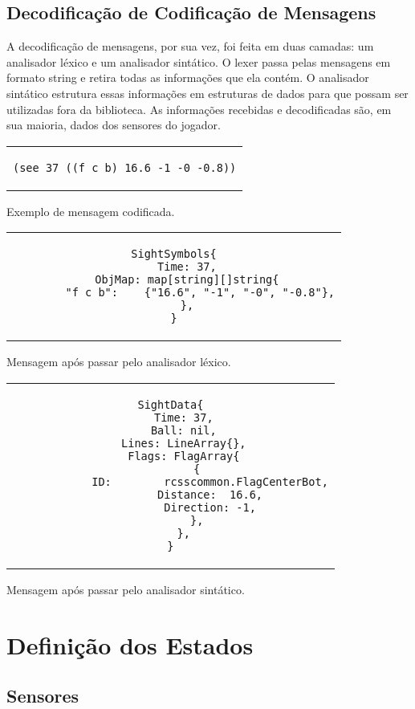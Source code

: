 \subsection{Decodificação de Codificação de Mensagens}
A decodificação de mensagens, por sua vez, foi feita em duas camadas: um analisador léxico e um analisador sintático. O lexer passa pelas mensagens em formato string e retira todas as informações que ela contém. O analisador sintático estrutura essas informações em estruturas de dados para que possam ser utilizadas fora da biblioteca. As informações recebidas e decodificadas são, em sua maioria, dados dos sensores do jogador.
\begin{center}



\begin{tabular}{c}
\begin{lstlisting}
(see 37 ((f c b) 16.6 -1 -0 -0.8))
\end{lstlisting}
\end{tabular}

Exemplo de mensagem codificada.


\begin{tabular}{c}
\begin{lstlisting}
SightSymbols{
	Time: 37,
	ObjMap: map[string][]string{
		"f c b":    {"16.6", "-1", "-0", "-0.8"},
	},
}
\end{lstlisting}
\end{tabular}

Mensagem após passar pelo analisador léxico.



\begin{tabular}{c}
\begin{lstlisting}
SightData{
	Time: 37,
	Ball: nil,
	Lines: LineArray{},
	Flags: FlagArray{
		{
			ID:        rcsscommon.FlagCenterBot,
			Distance:  16.6,
			Direction: -1,
		},
	},
}
\end{lstlisting}
\end{tabular}

Mensagem após passar pelo analisador sintático.

\end{center}

\section{Definição dos Estados}

\subsection{Sensores}

